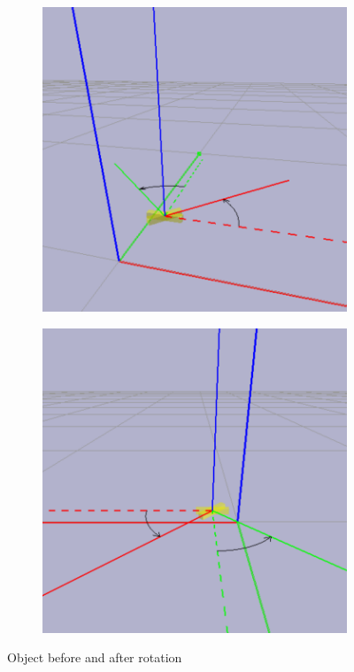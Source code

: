 \begin{figure}[h]
    \centering
    \begin{subfigure}[b]{0.45\textwidth}
        \includegraphics[width=\textwidth]{figures/coordinate_figure1.png}
    \end{subfigure}
    \hfill
    \begin{subfigure}[b]{0.45\textwidth}
        \includegraphics[width=\textwidth]{figures/coordinate_figure2.png}
    \end{subfigure}
    \caption{Object before and after rotation}
    \label{fig:orientations}
\end{figure}

